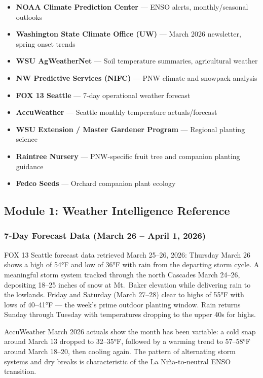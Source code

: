 \documentclass[11pt,letterpaper]{article}
\begin{document}
\begin{itemize}[leftmargin=*]
\item \textbf{NOAA Climate Prediction Center} --- ENSO alerts, monthly/seasonal outlooks
\item \textbf{Washington State Climate Office (UW)} --- March 2026 newsletter, spring onset trends
\item \textbf{WSU AgWeatherNet} --- Soil temperature summaries, agricultural weather
\item \textbf{NW Predictive Services (NIFC)} --- PNW climate and snowpack analysis
\item \textbf{FOX 13 Seattle} --- 7-day operational weather forecast
\item \textbf{AccuWeather} --- Seattle monthly temperature actuals/forecast
\item \textbf{WSU Extension / Master Gardener Program} --- Regional planting science
\item \textbf{Raintree Nursery} --- PNW-specific fruit tree and companion planting guidance
\item \textbf{Fedco Seeds} --- Orchard companion plant ecology
\end{itemize}

\subsection{Module 1: Weather Intelligence Reference}

\subsubsection{7-Day Forecast Data (March 26 -- April 1, 2026)}

FOX 13 Seattle forecast data retrieved March 25--26, 2026: Thursday March 26 shows a high of 54°F and low of 36°F with rain from the departing storm cycle. A meaningful storm system tracked through the north Cascades March 24--26, depositing 18--25 inches of snow at Mt.\ Baker elevation while delivering rain to the lowlands. Friday and Saturday (March 27--28) clear to highs of 55°F with lows of 40--41°F --- the week's prime outdoor planting window. Rain returns Sunday through Tuesday with temperatures dropping to the upper 40s for highs.

AccuWeather March 2026 actuals show the month has been variable: a cold snap around March 13 dropped to 32--35°F, followed by a warming trend to 57--58°F around March 18--20, then cooling again. The pattern of alternating storm systems and dry breaks is characteristic of the La Niña-to-neutral ENSO transition.
\end{document}
